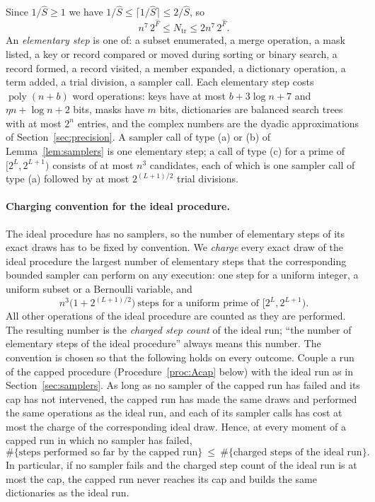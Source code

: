 \documentclass[11pt]{article}
\theoremstyle{definition}
\newcommand{\ceil}[1]{\lceil #1\rceil}
\newcommand{\poly}{\operatorname{poly}}
\newcommand{\Ntr}{N_{\mathrm{tr}}}
\begin{document}
Since $1/\hat S\ge1$ we have $1/\hat S\le\ceil{1/\hat S}\le2/\hat S$, so
\begin{equation}\label{eq:Ntr}
 n^7\,2^{\hat F}\le\Ntr\le2n^7\,2^{\hat F}.
\end{equation}
An \emph{elementary step} is one of: a subset enumerated, a merge operation, a mask listed, a key or record
compared or moved during sorting or binary search, a record formed, a record visited, a member expanded, a
dictionary operation, a term added, a trial division, a sampler call. Each elementary step costs $\poly(n+b)$ word
operations: keys have at most $b+3\log n+7$ and $\eta n+\log n+2$ bits, masks have $m$ bits, dictionaries are
balanced search trees with at most $2^n$ entries, and the complex numbers are the dyadic approximations of
Section~\ref{sec:precision}. A sampler call of type (a) or (b) of Lemma~\ref{lem:samplers} is one elementary step;
a call of type (c) for a prime of $[2^L,2^{L+1})$ consists of at most $n^3$ candidates, each of which is one
sampler call of type (a) followed by at most $2^{(L+1)/2}$ trial divisions.

\paragraph{Charging convention for the ideal procedure.} The ideal procedure has no samplers, so the number of
elementary steps of its exact draws has to be fixed by convention. We \emph{charge} every exact draw of the ideal
procedure the largest number of elementary steps that the corresponding bounded sampler can perform on any
execution: one step for a uniform integer, a uniform subset or a Bernoulli variable, and
\begin{equation}\label{eq:charge}
 n^3\bigl(1+2^{(L+1)/2}\bigr)\ \text{steps for a uniform prime of }[2^L,2^{L+1}).
\end{equation}
All other operations of the ideal procedure are counted as they are performed. The resulting number is the
\emph{charged step count} of the ideal run; ``the number of elementary steps of the ideal procedure'' always means
this number. The convention is chosen so that the following holds on every outcome. Couple a run of the capped
procedure (Procedure~\ref{proc:Acap} below) with the ideal run as in Section~\ref{sec:samplers}. As long as no sampler of the capped run has failed and its cap has not
intervened, the capped run has made the same draws and performed the same operations as the ideal run, and each of
its sampler calls has cost at most the charge of the corresponding ideal draw. Hence, at every moment of a capped
run in which no sampler has failed,
\begin{equation}\label{eq:dominate}
 \#\{\text{steps performed so far by the capped run}\}\ \le\ \#\{\text{charged steps of the ideal run}\}.
\end{equation}
In particular, if no sampler fails and the charged step count of the ideal run is at most the cap, the capped run
never reaches its cap and builds the same dictionaries as the ideal run.
\end{document}
